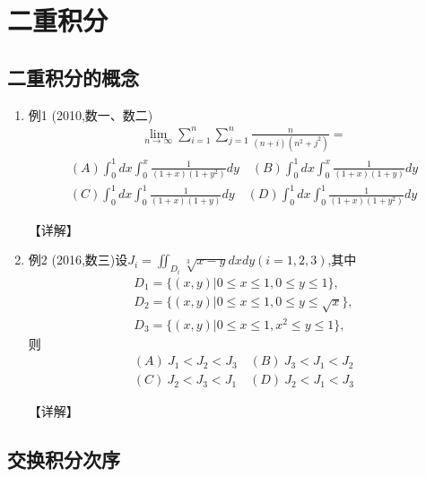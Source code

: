 \documentclass[12pt, a4paper, oneside, UTF8]{ctexbook}
\begin{document}

\else
\fi

\chapter{二重积分}
\section{二重积分的概念}

\begin{enumerate}[label=\arabic*.]
    \item 例1 (2010,数一、数二) 
    \begin{align*}
        \lim_{n\rightarrow\infty}\sum_{i=1}^n\sum_{j=1}^n\frac{n}{(n+i)(n^2+j^2)}=
    \end{align*}
    \begin{align*}
        (A)\int_0^1 dx\int_0^x\frac{1}{(1+x)(1+y^2)}dy \quad (B)\int_0^1 dx\int_0^x\frac{1}{(1+x)(1+y)}dy \\
        (C)\int_0^1 dx\int_0^1\frac{1}{(1+x)(1+y)}dy \quad (D)\int_0^1 dx\int_0^1\frac{1}{(1+x)(1+y^2)}dy
    \end{align*}
    
    \begin{solution}
    【详解】
    \end{solution}
    
    \item 例2 (2016,数三)设$J_i=\iint_{D_i}\sqrt[3]{x-y}dxdy(i=1,2,3)$,其中
    \begin{align*}
        D_1=\{(x,y)|0\leq x\leq 1,0\leq y\leq 1\}, \\
        D_2=\{(x,y)|0\leq x\leq 1,0\leq y\leq \sqrt{x}\}, \\
        D_3=\{(x,y)|0\leq x\leq 1,x^2\leq y\leq 1\},
    \end{align*}
    则
    \begin{align*}
        (A)\ J_1<J_2<J_3 \quad (B)\ J_3<J_1<J_2 \\
        (C)\ J_2<J_3<J_1 \quad (D)\ J_2<J_1<J_3
    \end{align*}
    
    \begin{solution}
    【详解】
    \end{solution}
\end{enumerate}

\section{交换积分次序}
\end{document}
